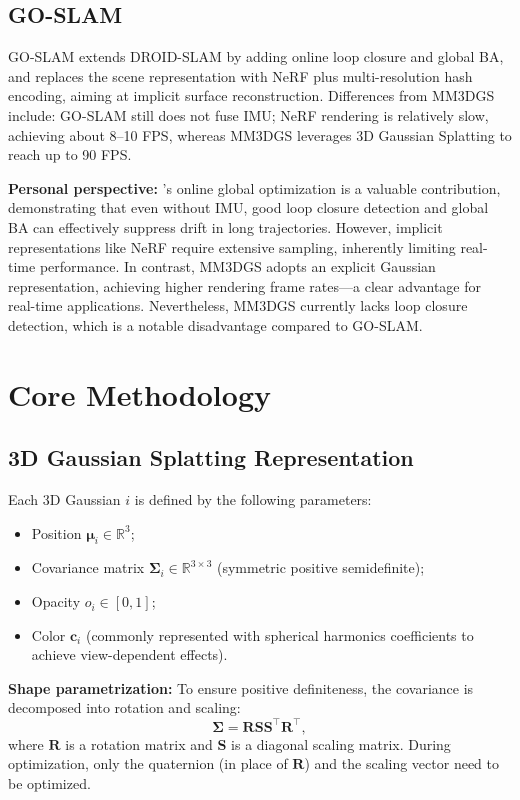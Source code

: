 \documentclass[12pt,a4paper,onecolumn]{article}
\begin{document}
\subsection{GO-SLAM \citep{GO-SLAM}}
GO-SLAM extends DROID-SLAM by adding online loop closure and global BA, and replaces the scene representation with NeRF plus multi-resolution hash encoding, aiming at implicit surface reconstruction. Differences from MM3DGS include: GO-SLAM still does not fuse IMU; NeRF rendering is relatively slow, achieving about 8–10 FPS, whereas MM3DGS leverages 3D Gaussian Splatting to reach up to 90 FPS.

\textbf{Personal perspective:} \citet{GO-SLAM}'s online global optimization is a valuable contribution, demonstrating that even without IMU, good loop closure detection and global BA can effectively suppress drift in long trajectories. However, implicit representations like NeRF require extensive sampling, inherently limiting real-time performance. In contrast, MM3DGS adopts an explicit Gaussian representation, achieving higher rendering frame rates—a clear advantage for real-time applications. Nevertheless, MM3DGS currently lacks loop closure detection, which is a notable disadvantage compared to GO-SLAM.

\section{Core Methodology}
\subsection{3D Gaussian Splatting Representation}

Each 3D Gaussian $i$ is defined by the following parameters:
\begin{itemize}
    \item Position $\boldsymbol{\mu}_i \in \mathbb{R}^3$;
    \item Covariance matrix $\boldsymbol{\Sigma}_i \in \mathbb{R}^{3\times 3}$ (symmetric positive semidefinite);
    \item Opacity $o_i \in [0,1]$;
    \item Color $\mathbf{c}_i$ (commonly represented with spherical harmonics coefficients to achieve view-dependent effects).
\end{itemize}

\textbf{Shape parametrization:} To ensure positive definiteness, the covariance is decomposed into rotation and scaling:
\[
\boldsymbol{\Sigma} = \mathbf{R} \mathbf{S} \mathbf{S}^\top \mathbf{R}^\top,
\]
where $\mathbf{R}$ is a rotation matrix and $\mathbf{S}$ is a diagonal scaling matrix. During optimization, only the quaternion (in place of $\mathbf{R}$) and the scaling vector need to be optimized.
\end{document}
